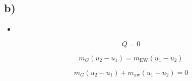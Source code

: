 

\subsection*{b)}

\begin{itemize}
    \item {}
\end{itemize}

\begin{equation*}
Q = 0
\end{equation*}

\begin{equation*}
m_{G} (u_{2} - u_{1}) = m_{\text{EW}} (u_{1} - u_{2})
\end{equation*}

\begin{equation*}
m_{G} (u_{2} - u_{1}) + m_{\text{aw}} (u_{1} - u_{2}) = 0
\end{equation*}